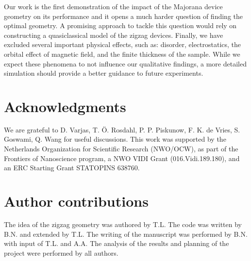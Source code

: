 \documentclass[english, twocolumn, 10pt, aps, superscriptaddress, floatfix, prb, citeautoscript]{revtex4-1}
\renewcommand{\comment}[2]{#2}
\begin{document}
\comment{Optimizing the geometry, a more detailed modeling, and a simple analytical estimation are open questions for further research}
Our work is the first demonstration of the impact of the Majorana device geometry on its performance and it opens a much harder question of finding the optimal geometry.
A promising approach to tackle this question would rely on constructing a quasiclassical model of the zigzag devices. 
Finally, we have excluded several important physical effects, such as: disorder, electrostatics, the orbital effect of magnetic field, and the finite thickness of the sample.
While we expect these phenomena to not influence our qualitative findings, a more detailed simulation should provide a better guidance to future experiments.

\section{Acknowledgments}
We are grateful to D. Varjas, T. Ö. Rosdahl, P. P. Piskunow, F. K. de Vries, S. Goswami, Q. Wang for useful discussions.
This work was supported by the Netherlands Organization for Scientific Research (NWO/OCW), as part of the Frontiers of Nanoscience program, a NWO VIDI Grant (016.Vidi.189.180), and an ERC Starting Grant STATOPINS 638760.

\section{Author contributions}
The idea of the zigzag geometry was authored by T.L.
The code was written by B.N. and extended by T.L.
The writing of the manuscript was performed by B.N. with input of T.L. and A.A.
The analysis of the results and planning of the project were performed by all authors.



\end{document}
